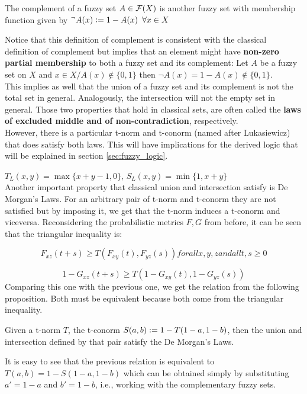 \begin{definition}[Complement]
  The complement of a fuzzy set $A\in \mathcal{F}(X)$ is another fuzzy set with membership function given by $^\lnot A(x) \coleq 1 - A(x) \forall x\in X$
\end{definition}

Notice that this definition of complement is consistent with the classical definition of complement but implies that an element might have \textbf{non-zero partial membership} to both a fuzzy set and its complement: Let $A$ be a fuzzy set on $X$ and $x \in X / A(x)\notin \{0,1\}$ then $\lnot A(x)= 1 - A(x) \notin \{0,1\}$.\\

This implies as well that the union of a fuzzy set and its complement is not the total set in general. Analogously, the intersection will not the empty set in general. Those two properties that hold in classical sets, are often called the \textbf{laws of excluded middle and of non-contradiction}, respectively.\\

However, there is a particular t-norm and t-conorm (named after Lukasiewicz) that does satisfy both laws. This will have implications for the derived logic that will be explained in section \ref{sec:fuzzy_logic}. 

\hspace{10em}$T_L(x,y)=\max\{x+y-1,0\},\, S_L(x,y)=\min\{1,x+y\}$\\

Another important property that classical union and intersection satisfy is De Morgan's Laws. For an arbitrary pair of t-norm and t-conorm they are not satisfied but by imposing it, we get that the t-norm induces a t-conorm and viceversa. Reconsidering the probabilistic metrics $F,G$ from before, it can be seen that the triangular inequality is:

\[F_{xz}(t + s) \geq T(F_{xy}(t), F_{yz}(s)) for all x, y, z and all t, s \geq 0\]

\[1 - G_{xz}(t + s) \geq T(1 - G_{xy}(t), 1 - G_{yz}(s))\]
Comparing this one with the previous one, we get the relation from the following proposition. Both must be equivalent because both come from the triangular inequality.

\begin{proposition}
  Given a t-norm $T$, the t-conorm $S(a,b)\mathrel{\mathop:}= 1 - T(1-a, 1-b)$, then the union and intersection defined by that pair satisfy the De Morgan's Laws.
\end{proposition}
\begin{remark}
  It is easy to see that the previous relation is equivalent to $T(a,b) = 1-S(1-a, 1-b)$ which can be obtained simply by substituting $a'=1-a$ and $b'=1-b$, i.e., working with the complementary fuzzy sets.
\end{remark}

